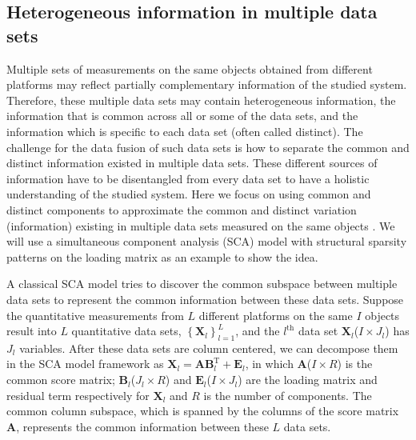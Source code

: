 \subsection{Heterogeneous information in multiple data sets}
Multiple sets of measurements on the same objects obtained from different platforms may reflect partially complementary information of the studied system. Therefore, these multiple data sets may contain heterogeneous information, the information that is common across all or some of the data sets, and the information which is specific to each data set (often called distinct). The challenge for the data fusion of such data sets is how to separate the common and distinct information existed in multiple data sets. These different sources of information have to be disentangled from every data set to have a holistic understanding of the studied system. Here we focus on using common and distinct components to approximate the common and distinct variation (information) existing in multiple data sets measured on the same objects \cite{smilde2017common}. We will use a simultaneous component analysis (SCA) model with structural sparsity patterns on the loading matrix \cite{gaynanova2017structural} as an example to show the idea.

A classical SCA model tries to discover the common subspace between multiple data sets to represent the common information between these data sets. Suppose the quantitative measurements from $L$ different platforms on the same $I$ objects result into $L$ quantitative data sets, $\left\{\mathbf{X}_l \right\}_{l=1}^{L}$, and the $l^{\text{th}}$ data set $\mathbf{X}_l$($I \times J_l$) has $J_l$ variables. After these data sets are column centered, we can decompose them in the SCA model framework as $\mathbf{X}_l = \mathbf{AB}_l^{\text{T}} + \mathbf{E}_l$, in which $\mathbf{A}$($I\times R$) is the common score matrix; $\mathbf{B}_l$($J_l\times R$) and $\mathbf{E}_l$($I\times J_l$) are the loading matrix and residual term respectively for $\mathbf{X}_l$ and $R$ is the number of components. The common column subspace, which is spanned by the columns of the score matrix $\mathbf{A}$, represents the common information between these $L$ data sets.

